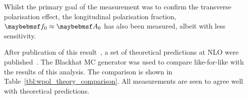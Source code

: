 Whilst the primary goal of the measurement was to confirm the transverse
polarisation effect, the longitudinal polarisation fraction, $\f0 \approx
\Azero$ has also been measured, albeit with less sensitivity.

After publication of this result~\cite{cms_wpol_paper}, a set of theoretical
predictions at \ac{NLO} were published~\cite{berger_left_handed_w}. The Blackhat
\ac{MC} generator was used to compare like-for-like with the results of this
analysis. The comparison is shown in Table~\ref{tbl:wpol_theory_comparison}. All
measurements are seen to agree well with theoretical predictions.

